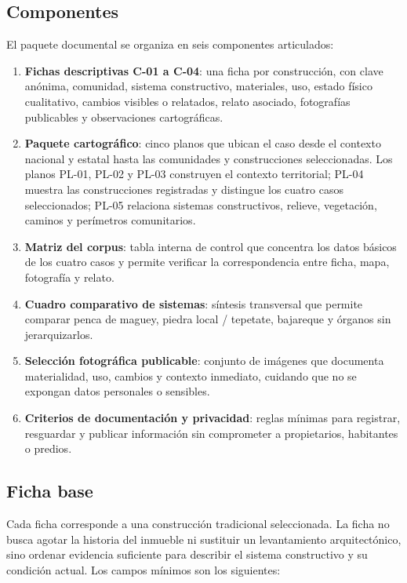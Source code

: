 \subsection{Componentes}

El paquete documental se organiza en seis componentes articulados:

\begin{enumerate}
	\item \textbf{Fichas descriptivas C-01 a C-04}: una ficha por construcción, con clave anónima, comunidad, sistema constructivo, materiales, uso, estado físico cualitativo, cambios visibles o relatados, relato asociado, fotografías publicables y observaciones cartográficas.
	\item \textbf{Paquete cartográfico}: cinco planos que ubican el caso desde el contexto nacional y estatal hasta las comunidades y construcciones seleccionadas. Los planos PL-01, PL-02 y PL-03 construyen el contexto territorial; PL-04 muestra las construcciones registradas y distingue los cuatro casos seleccionados; PL-05 relaciona sistemas constructivos, relieve, vegetación, caminos y perímetros comunitarios.
	\item \textbf{Matriz del corpus}: tabla interna de control que concentra los datos básicos de los cuatro casos y permite verificar la correspondencia entre ficha, mapa, fotografía y relato.
	\item \textbf{Cuadro comparativo de sistemas}: síntesis transversal que permite comparar penca de maguey, piedra local / tepetate, bajareque y órganos sin jerarquizarlos.
	\item \textbf{Selección fotográfica publicable}: conjunto de imágenes que documenta materialidad, uso, cambios y contexto inmediato, cuidando que no se expongan datos personales o sensibles.
	\item \textbf{Criterios de documentación y privacidad}: reglas mínimas para registrar, resguardar y publicar información sin comprometer a propietarios, habitantes o predios.
\end{enumerate}

\subsection{Ficha base}

Cada ficha corresponde a una construcción tradicional seleccionada. La ficha no busca agotar la historia del inmueble ni sustituir un levantamiento arquitectónico, sino ordenar evidencia suficiente para describir el sistema constructivo y su condición actual. Los campos mínimos son los siguientes:

